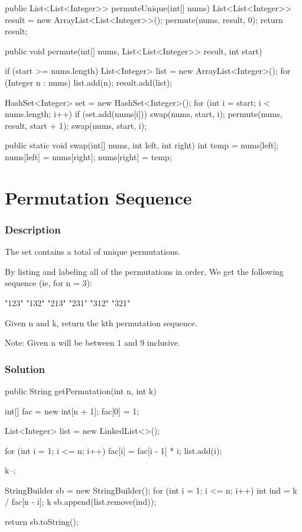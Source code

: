 \begin{Code}
public List<List<Integer>> permuteUnique(int[] nums) {
    List<List<Integer>> result = new ArrayList<List<Integer>>();
    permute(nums, result, 0);
    return result;
}

public void permute(int[] nums, List<List<Integer>> result, int start) {
    if (start >= nums.length) {
        List<Integer> list = new ArrayList<Integer>();
        for (Integer n : nums) {
            list.add(n);
        }
        result.add(list);
    }

    HashSet<Integer> set = new HashSet<Integer>();
    for (int i = start; i < nums.length; i++) {
        if (set.add(nums[i])) {
            swap(nums, start, i);
            permute(nums, result, start + 1);
            swap(nums, start, i);
        }
    }
}

public static void swap(int[] nums, int left, int right) {
    int temp = nums[left];
    nums[left] = nums[right];
    nums[right] = temp;
}
\end{Code}

\newpage

\section{Permutation Sequence} %

\subsubsection{Description}
The set \code{[1,2,3,…,n]} contains a total of  unique permutations.

By listing and labeling all of the permutations in order,
We get the following sequence (ie, for n = 3):
\begin{Code}
"123"
"132"
"213"
"231"
"312"
"321"
\end{Code}

Given n and k, return the kth permutation sequence.

Note: Given n will be between 1 and 9 inclusive.

\subsubsection{Solution}

\begin{Code}
public String getPermutation(int n, int k) {
    int[] fac = new int[n + 1];
    fac[0] = 1;

    List<Integer> list = new LinkedList<>();

    for (int i = 1; i <= n; i++) {
        fac[i] = fac[i - 1] * i;
        list.add(i);
    }

    k--;

    StringBuilder sb = new StringBuilder();
    for (int i = 1; i <= n; i++) {
        int ind = k / fac[n - i];
        k %
        sb.append(list.remove(ind));
    }

    return sb.toString();
}
\end{Code}

